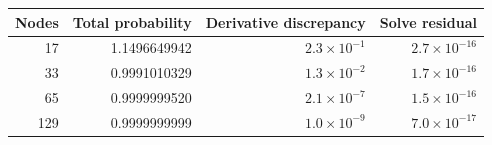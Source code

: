 \begin{tabular}{rrrr}
\toprule
Nodes & Total probability & Derivative discrepancy & Solve residual \\
\midrule
17 & 1.1496649942 & $2.3\times10^{-1}$ & $2.7\times10^{-16}$ \\
33 & 0.9991010329 & $1.3\times10^{-2}$ & $1.7\times10^{-16}$ \\
65 & 0.9999999520 & $2.1\times10^{-7}$ & $1.5\times10^{-16}$ \\
129 & 0.9999999999 & $1.0\times10^{-9}$ & $7.0\times10^{-17}$ \\
\bottomrule
\end{tabular}
